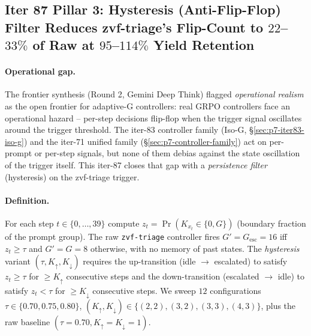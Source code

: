 \subsection{Iter 87 Pillar 3: Hysteresis (Anti-Flip-Flop) Filter
              Reduces zvf-triage's Flip-Count to $22$--$33\%$ of Raw
              at $95$--$114\%$ Yield Retention}
\label{sec:p7-iter87-hysteresis}

\paragraph{Operational gap.}
The frontier synthesis (Round 2, Gemini Deep Think) flagged
\emph{operational realism} as the open frontier for adaptive-G
controllers: real GRPO controllers face an operational hazard --
per-step decisions flip-flop when the trigger signal oscillates
around the trigger threshold.  The iter-83 controller family
(Iso-G, \S\ref{sec:p7-iter83-iso-g}) and the iter-71 unified
family (\S\ref{sec:p7-controller-family}) act on per-prompt or
per-step signals, but none of them debias against the state
oscillation of the trigger itself.  This iter-87 closes that gap
with a \emph{persistence filter} (hysteresis) on the zvf-triage
trigger.

\paragraph{Definition.}
For each step $t \in \{0,\dots,39\}$ compute
$z_t = \Pr(K_{x_t} \in \{0, G\})$ (boundary fraction of the prompt
group).  The raw \texttt{zvf-triage} controller fires
$G' = G_{\mathrm{esc}} = 16$ iff $z_t \ge \tau$ and $G' = G = 8$
otherwise, with no memory of past states.
The \emph{hysteresis} variant
$(\tau, K_{\uparrow}, K_{\downarrow})$ requires the up-transition
(idle $\to$ escalated) to satisfy $z_t \ge \tau$ for
$\ge K_{\uparrow}$ consecutive steps and the down-transition
(escalated $\to$ idle) to satisfy $z_t < \tau$ for
$\ge K_{\downarrow}$ consecutive steps.
We sweep $12$ configurations
$\tau \in \{0.70, 0.75, 0.80\}$,
$(K_{\uparrow}, K_{\downarrow}) \in \{(2,2), (3,2), (3,3), (4,3)\}$,
plus the raw baseline $(\tau{=}0.70, K_{\uparrow}{=}K_{\downarrow}{=}1)$.

